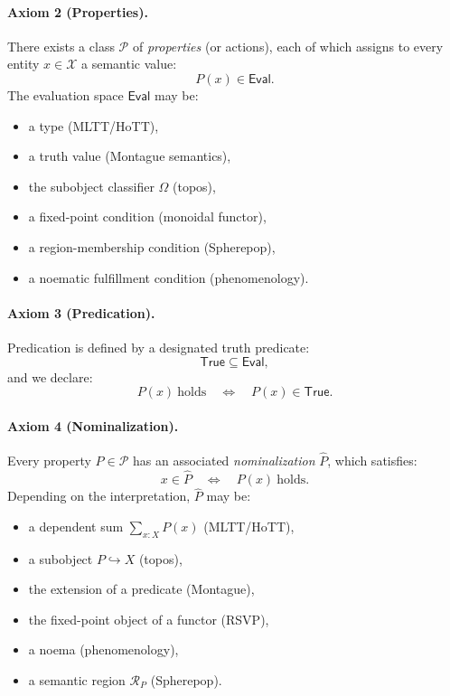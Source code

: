 \documentclass[12pt,letterpaper]{article}
\begin{document}
\paragraph{Axiom 2 (Properties).}
There exists a class $\mathcal{P}$ of \emph{properties} (or actions), each of
which assigns to every entity $x \in \mathcal{X}$ a semantic value:
\[
P(x) \in \mathsf{Eval}.
\]
The evaluation space $\mathsf{Eval}$ may be:
\begin{itemize}
    \item a type (MLTT/HoTT),
    \item a truth value (Montague semantics),
    \item the subobject classifier $\Omega$ (topos),
    \item a fixed-point condition (monoidal functor),
    \item a region-membership condition (Spherepop),
    \item a noematic fulfillment condition (phenomenology).
\end{itemize}

\paragraph{Axiom 3 (Predication).}
Predication is defined by a designated truth predicate:
\[
\mathsf{True} \subseteq \mathsf{Eval},
\]
and we declare:
\[
P(x)\ \text{holds} \quad\Longleftrightarrow\quad P(x) \in \mathsf{True}.
\]

\paragraph{Axiom 4 (Nominalization).}
Every property $P \in \mathcal{P}$ has an associated \emph{nominalization}
$\widehat{P}$, which satisfies:
\[
x \in \widehat{P}
\quad\Longleftrightarrow\quad
P(x)\ \text{holds}.
\]
Depending on the interpretation, $\widehat{P}$ may be:
\begin{itemize}
    \item a dependent sum $\sum_{x:X}P(x)$ (MLTT/HoTT),
    \item a subobject $P \hookrightarrow X$ (topos),
    \item the extension of a predicate (Montague),
    \item the fixed-point object of a functor (RSVP),
    \item a noema (phenomenology),
    \item a semantic region $\mathcal{R}_P$ (Spherepop).
\end{itemize}
\end{document}
